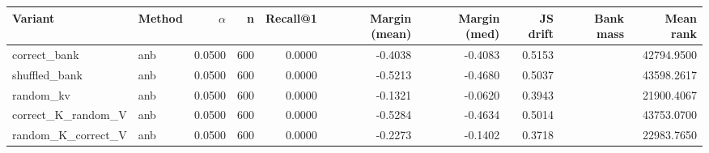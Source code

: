\begin{tabular}{l l r r r r r r r r}
\toprule
Variant & Method & $\alpha$ & n & Recall@1 & Margin (mean) & Margin (med) & JS drift & Bank mass & Mean rank \\
\midrule
correct\_bank & anb & 0.0500 & 600 & 0.0000 & -0.4038 & -0.4083 & 0.5153 &  & 42794.9500 \\
shuffled\_bank & anb & 0.0500 & 600 & 0.0000 & -0.5213 & -0.4680 & 0.5037 &  & 43598.2617 \\
random\_kv & anb & 0.0500 & 600 & 0.0000 & -0.1321 & -0.0620 & 0.3943 &  & 21900.4067 \\
correct\_K\_random\_V & anb & 0.0500 & 600 & 0.0000 & -0.5284 & -0.4634 & 0.5014 &  & 43753.0700 \\
random\_K\_correct\_V & anb & 0.0500 & 600 & 0.0000 & -0.2273 & -0.1402 & 0.3718 &  & 22983.7650 \\
\bottomrule
\end{tabular}
